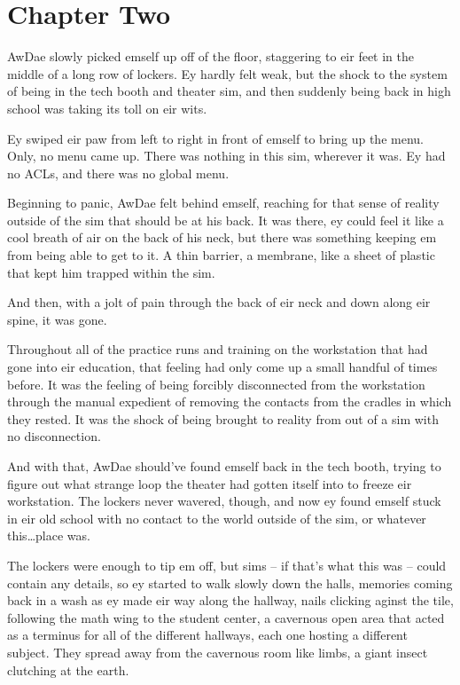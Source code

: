 \chapter*{Chapter Two}

AwDae slowly picked emself up off of the floor, staggering to eir feet in the middle of a long row of lockers.  Ey hardly felt weak, but the shock to the system of being in the tech booth and theater sim, and then suddenly being back in high school was taking its toll on eir wits.

Ey swiped eir paw from left to right in front of emself to bring up the menu.  Only, no menu came up.  There was nothing in this sim, wherever it was.  Ey had no ACLs, and there was no global menu.

Beginning to panic, AwDae felt behind emself, reaching for that sense of reality outside of the sim that should be at his back.  It was there, ey could feel it like a cool breath of air on the back of his neck, but there was something keeping em from being able to get to it.  A thin barrier, a membrane, like a sheet of plastic that kept him trapped within the sim.

And then, with a jolt of pain through the back of eir neck and down along eir spine, it was gone.

Throughout all of the practice runs and training on the workstation that had gone into eir education, that feeling had only come up a small handful of times before.  It was the feeling of being forcibly disconnected from the workstation through the manual expedient of removing the contacts from the cradles in which they rested.  It was the shock of being brought to reality from out of a sim with no disconnection.

And with that, AwDae should've found emself back in the tech booth, trying to figure out what strange loop the theater had gotten itself into to freeze eir workstation.  The lockers never wavered, though, and now ey found emself stuck in eir old school with no contact to the world outside of the sim, or whatever this\ldots{}place was.

The lockers were enough to tip em off, but sims -- if that's what this was -- could contain any details, so ey started to walk slowly down the halls, memories coming back in a wash as ey made eir way along the hallway, nails clicking aginst the tile, following the math wing to the student center, a cavernous open area that acted as a terminus for all of the different hallways, each one hosting a different subject.  They spread away from the cavernous room like limbs, a giant insect clutching at the earth.

